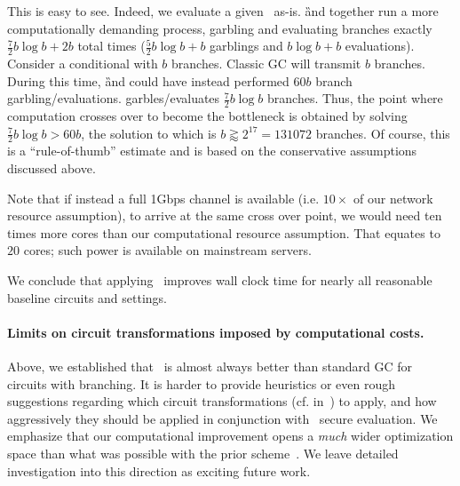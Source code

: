 This is easy to see.  Indeed, we evaluate a given \cir\ as-is.  \G and \E together 
run a more computationally demanding  process, garbling and evaluating 
branches exactly $\frac{7}{2} b \log b + 2b$ total times ($\frac{5}{2} b \log b + b$ garblings and $ b \log b + b$  evaluations).  Consider a
conditional with $b$ branches.  Classic GC will transmit $b$ branches.
During this time, \G and \E could have instead performed $60 b$ branch garbling/evaluations. 
\ourschemelong  garbles/evaluates $\frac{7}{2} b \log b$ branches.  Thus,  the point where
computation crosses over to become the bottleneck is obtained by
solving $\frac{7}{2}b \log b > 60 b$, the solution to which is $b \gtrapprox 2^{17} = 131072$
branches.  Of course, this is a ``rule-of-thumb'' estimate and is based on the conservative assumptions discussed above.

Note that if instead a full 1Gbps channel is available (i.e. $10\times$ of our network resource assumption),  to arrive at the same cross over  point, we would need ten times more cores than our computational resource assumption.  That equates to $20$ cores; such power is available on mainstream servers.

We conclude that applying \ourschemelong\ improves wall clock
time for nearly all reasonable baseline circuits and settings.


\paragraph{Limits on circuit transformations imposed by computational costs.}
Above, we established that \ourschemelong\ is almost always
better than standard GC for circuits with branching.
%
It is harder to provide heuristics or
even rough suggestions regarding which circuit transformations (cf.
in~) to apply, and how aggressively
they should be applied in conjunction with \ourschemelong\ secure evaluation.  We
emphasize that our computational improvement opens
a {\em much} wider optimization space than what was possible with the
prior scheme~\HK.  We leave detailed investigation into this direction
as exciting future work.





